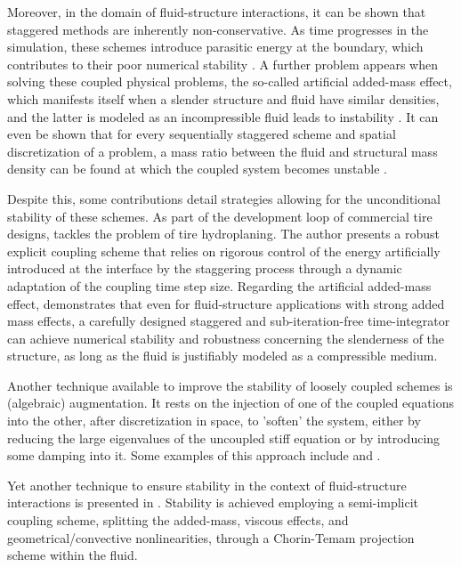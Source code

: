 Moreover, in the domain of fluid-structure interactions, it can be shown that staggered methods are inherently non-conservative.
As time progresses in the simulation, these schemes introduce parasitic energy at the boundary, which contributes to their poor numerical stability \citep{michler_relevance_2003}.
A further problem appears when solving these coupled physical problems, the so-called artificial added-mass effect, which manifests itself when a slender structure and fluid have similar densities, and the latter is modeled as an incompressible fluid leads to instability \citep{causin_added-mass_2005, forster_robust_2007}.
It can even be shown that for every sequentially staggered scheme and spatial discretization of a problem, a mass ratio between the fluid and structural mass density can be found at which the coupled system becomes unstable \citep{forster_artificial_2007}.

Despite this, some contributions detail strategies allowing for the unconditional stability of these schemes.
As part of the development loop of commercial tire designs, \cite{gillard_efficient_2019} tackles the problem of tire hydroplaning.
The author presents a robust explicit coupling scheme that relies on rigorous control of the energy artificially introduced at the interface by the staggering process through a dynamic adaptation of the coupling time step size.
Regarding the artificial added-mass effect, \cite{farhat_robust_2010} demonstrates that even for fluid-structure applications with strong added mass effects, a carefully designed staggered and sub-iteration-free time-integrator can achieve numerical stability and robustness concerning the slenderness of the structure, as long as the fluid is justifiably modeled as a compressible medium.

Another technique available to improve the stability of loosely coupled schemes is (algebraic) augmentation.
It rests on the injection of one of the coupled equations into the other, after discretization in space, to 'soften' the system, either by reducing the large eigenvalues of the uncoupled stiff equation or by introducing some damping into it.
Some examples of this approach include \cite{park_stabilization_1977} and \cite{park_stabilization_1983}.

Yet another technique to ensure stability in the context of fluid-structure interactions is presented in \cite{fernandez_projection_2006}.
Stability is achieved employing a semi-implicit coupling scheme, splitting the added-mass, viscous effects, and geometrical/convective nonlinearities, through a Chorin-Temam projection scheme within the fluid.

